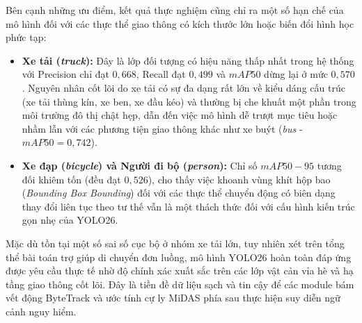 Bên cạnh những ưu điểm, kết quả thực nghiệm cũng chỉ ra một số hạn chế của mô hình đối với các thực thể giao thông có kích thước lớn hoặc biến đổi hình học phức tạp:
\begin{itemize}
    \item \textbf{Xe tải (\textit{truck}):} Đây là lớp đối tượng có hiệu năng thấp nhất trong hệ thống với Precision chỉ đạt $0,668$, Recall đạt $0,499$ và $mAP50$ dừng lại ở mức $0,570$. Nguyên nhân cốt lõi do xe tải có sự đa dạng rất lớn về kiểu dáng cấu trúc (xe tải thùng kín, xe ben, xe đầu kéo) và thường bị che khuất một phần trong môi trường đô thị chật hẹp, dẫn đến việc mô hình dễ trượt mục tiêu hoặc nhầm lẫn với các phương tiện giao thông khác như xe buýt (\textit{bus} - $mAP50 = 0,742$).
    \item \textbf{Xe đạp (\textit{bicycle}) và Người đi bộ (\textit{person}):} Chỉ số $mAP50-95$ tương đối khiêm tốn (đều đạt $0,526$), cho thấy việc khoanh vùng khít hộp bao (\textit{Bounding Box Bounding}) đối với các thực thể chuyển động có biên dạng thay đổi liên tục theo tư thế vẫn là một thách thức đối với cấu hình kiến trúc gọn nhẹ của YOLO26.
\end{itemize}

Mặc dù tồn tại một số sai số cục bộ ở nhóm xe tải lớn, tuy nhiên xét trên tổng thể bài toán trợ giúp di chuyển đơn luồng, mô hình YOLO26 hoàn toàn đáp ứng được yêu cầu thực tế nhờ độ chính xác xuất sắc trên các lớp vật cản vỉa hè và hạ tầng giao thông cốt lõi. Đây là tiền đề dữ liệu sạch và tin cậy để các module bám vết động ByteTrack và ước tính cự ly MiDAS phía sau thực hiện suy diễn ngữ cảnh nguy hiểm.